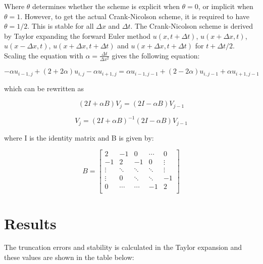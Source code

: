 \documentclass[10pt,a4paper]{article}
\begin{document}
\noindent Where $\theta$ determines whether the scheme is explicit when $\theta = 0$, or implicit when $\theta = 1$. However, to get the actual Crank-Nicolson scheme, it is required to have $\theta = 1/2$. This is stable for all $\Delta x$ and $\Delta t$. The Crank-Nicolson scheme is derived by Taylor expanding the forward Euler method $u(x,t + \Delta t)$, $u(x + \Delta x,t)$, $u(x - \Delta x,t)$, $u(x + \Delta x, t + \Delta t)$ and $u(x + \Delta x, t + \Delta t)$ for $t + \Delta t/2$.\\

\noindent Scaling the equation with $\alpha = \frac{\Delta t}{\Delta x^2}$ gives the following equation:

\begin{equation}
-\alpha u_{i-1,j} + (2 + 2\alpha)u_{i,j} -\alpha u_{i+1,j} = \alpha u_{i-1,j-1} + (2-2\alpha)u_{i,j-1} + \alpha u_{i+1,j-1}
\end{equation}

\noindent which can be rewritten as

\begin{equation}
(2I + \alpha B)V_j = (2I - \alpha B)V_{j-1}
\end{equation}

\begin{equation}
V_j = (2I + \alpha B)^{-1}(2I - \alpha B)V_{j-1}
\end{equation}

\noindent where I is the identity matrix and B is given by:

\begin{equation}
B = \begin{bmatrix}
2 & -1 & 0 & \cdots &0\\
-1 & 2 & -1 & 0 & \vdots\\
\vdots & \ddots & \ddots & \ddots & \vdots\\
\vdots & 0 & \ddots & \ddots & -1\\
0 & \cdots & \cdots & -1 & 2\\
\end{bmatrix}
\end{equation}






\newpage
\section*{Results}


\noindent The truncation errors and stability is calculated in the Taylor expansion and these values are shown in the table below:
\end{document}
